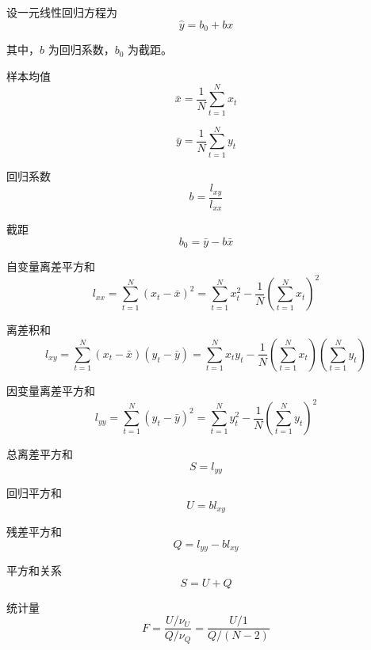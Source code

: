 \documentclass[12pt,a4paper]{ctexart}
\begin{document}
设一元线性回归方程为
\begin{equation*}
\hat{y}=b_0+bx
\end{equation*}

其中，$b$ 为回归系数，$b_0$ 为截距。

样本均值
\begin{equation*}
\bar{x}=\frac{1}{N}\sum_{t=1}^{N}x_t
\end{equation*}

\begin{equation*}
\bar{y}=\frac{1}{N}\sum_{t=1}^{N}y_t
\end{equation*}

回归系数
\begin{equation*}
b=\frac{l_{xy}}{l_{xx}}
\end{equation*}

截距
\begin{equation*}
b_0=\bar{y}-b\bar{x}
\end{equation*}

自变量离差平方和
\begin{equation*}
l_{xx}=\sum_{t=1}^{N}(x_t-\bar{x})^2
=\sum_{t=1}^{N}x_t^2-\frac{1}{N}\left(\sum_{t=1}^{N}x_t\right)^2
\end{equation*}

离差积和
\begin{equation*}
l_{xy}=\sum_{t=1}^{N}(x_t-\bar{x})(y_t-\bar{y})
=\sum_{t=1}^{N}x_t y_t-\frac{1}{N}\left(\sum_{t=1}^{N}x_t\right)\left(\sum_{t=1}^{N}y_t\right)
\end{equation*}

因变量离差平方和
\begin{equation*}
l_{yy}=\sum_{t=1}^{N}(y_t-\bar{y})^2
=\sum_{t=1}^{N}y_t^2-\frac{1}{N}\left(\sum_{t=1}^{N}y_t\right)^2
\end{equation*}

总离差平方和
\begin{equation*}
S=l_{yy}
\end{equation*}

回归平方和
\begin{equation*}
U=b l_{xy}
\end{equation*}

残差平方和
\begin{equation*}
Q=l_{yy}-bl_{xy}
\end{equation*}

平方和关系
\begin{equation*}
S=U+Q
\end{equation*}

统计量
\begin{equation*}
F=\frac{U/\nu_U}{Q/\nu_Q}=\frac{U/1}{Q/(N-2)}
\end{equation*}
\end{document}
